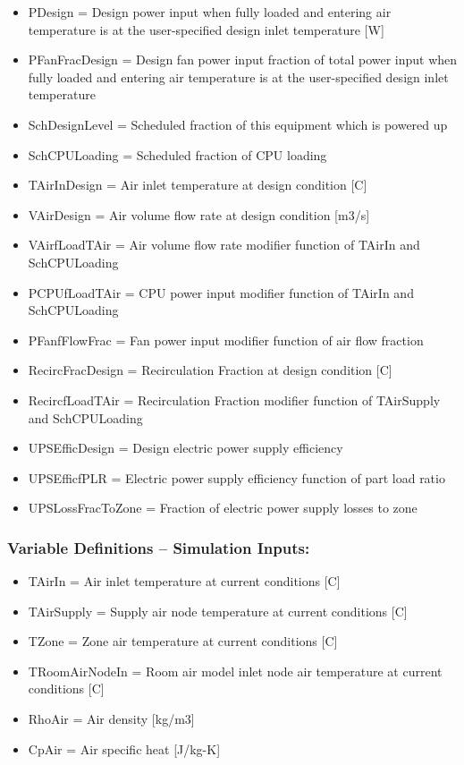 \begin{itemize}
\tightlist
\item
  PDesign = Design power input when fully loaded and entering air temperature is at the user-specified design inlet temperature {[}W{]}
\item
  PFanFracDesign = Design fan power input fraction of total power input when fully loaded and entering air temperature is at the user-specified design inlet temperature
\item
  SchDesignLevel = Scheduled fraction of this equipment which is powered up
\item
  SchCPULoading = Scheduled fraction of CPU loading
\item
  TAirInDesign = Air inlet temperature at design condition {[}C{]}
\item
  VAirDesign = Air volume flow rate at design condition {[}m3/s{]}
\item
  VAirfLoadTAir = Air volume flow rate modifier function of TAirIn and SchCPULoading
\item
  PCPUfLoadTAir = CPU power input modifier function of TAirIn and SchCPULoading
\item
  PFanfFlowFrac = Fan power input modifier function of air flow fraction
\item
  RecircFracDesign = Recirculation Fraction at design condition {[}C{]}
\item
  RecircfLoadTAir = Recirculation Fraction modifier function of TAirSupply and SchCPULoading
\item
  UPSEfficDesign = Design electric power supply efficiency
\item
  UPSEfficfPLR = Electric power supply efficiency function of part load ratio
\item
  UPSLossFracToZone = Fraction of electric power supply losses to zone
\end{itemize}

\subsubsection{Variable Definitions -- Simulation Inputs:}\label{variable-definitions-simulation-inputs}

\begin{itemize}
\tightlist
\item
  TAirIn = Air inlet temperature at current conditions {[}C{]}
\item
  TAirSupply = Supply air node temperature at current conditions {[}C{]}
\item
  TZone = Zone air temperature at current conditions {[}C{]}
\item
  TRoomAirNodeIn = Room air model inlet node air temperature at current conditions {[}C{]}
\item
  RhoAir = Air density {[}kg/m3{]}
\item
  CpAir = Air specific heat {[}J/kg-K{]}
\end{itemize}


